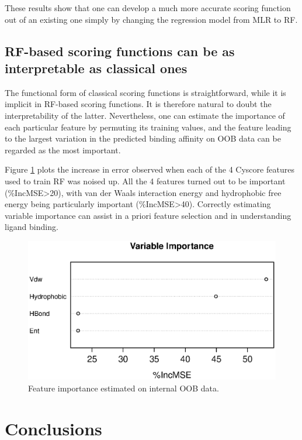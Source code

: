 \documentclass[journal=jacsat,manuscript=article]{achemso}
\begin{document}
These results show that one can develop a much more accurate scoring function out of an existing one simply by changing the regression model from MLR to RF.

\subsection{RF-based scoring functions can be as interpretable as classical ones}

The functional form of classical scoring functions is straightforward, while it is implicit in RF-based scoring functions. It is therefore natural to doubt the interpretability of the latter. Nevertheless, one can estimate the importance of each particular feature by permuting its training values, and the feature leading to the largest variation in the predicted binding affinity on OOB data can be regarded as the most important.

Figure \ref{fig:varimp} plots the increase in error observed when each of the 4 Cyscore features used to train RF was noised up. All the 4 features turned out to be important (\%IncMSE\textgreater 20), with van der Waals interaction energy and hydrophobic free energy being particularly important (\%IncMSE\textgreater 40). Correctly estimating variable importance can assist in a priori feature selection and in understanding ligand binding.

\begin{figure}
\includegraphics[width=\linewidth]{../rfcyscore/x4/rf/trn-1105.eps}
\caption{Feature importance estimated on internal OOB data.}
\label{fig:varimp}
\end{figure}

\section{Conclusions}
\end{document}
